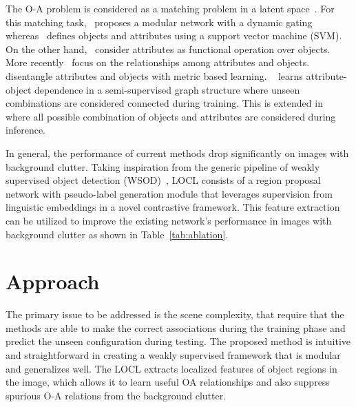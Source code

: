 \documentclass{bmvc2k}
\begin{document}
The O-A problem is considered as a matching problem in a latent space~\cite{misra2017red,Wei_2019_ICCV,nan2019recognizing, purushwalkam2019task}. For this matching task,~\cite{purushwalkam2019task} proposes a modular network with a dynamic gating whereas~\cite{misra2017red} defines objects and attributes using a support vector machine (SVM). On the other hand,~\cite{nagarajan2018attributes,li2020symmetry} consider attributes as functional operation over objects. More recently~\cite{Atzmon_casual,naeem2021learning,mancini2021open,xu2021relation,ruis2021independent} focus on the relationships among attributes and objects. ~\cite{Atzmon_casual} disentangle attributes and objects with metric based learning. ~\cite{naeem2021learning} learns attribute-object dependence in a semi-supervised graph structure where unseen combinations are considered connected during training.  This is extended in~\cite{mancini2021open, xu2021relation, vaswani2017attention} where all possible combination of objects and attributes are considered during inference. 


In general, the performance of current methods  drop significantly on images with background clutter. Taking inspiration from the generic pipeline of weakly supervised object detection (WSOD)~\cite{dietterich1997solving,gonthier2020multiple,uijlings2013selective,kumar2020deep,diba2017weakly,kantorov2016contextlocnet,mcever2022context}, LOCL consists of a region proposal network with pseudo-label generation module that leverages supervision from linguistic embeddings in a novel contrastive framework. This feature extraction can be utilized to improve the existing network's performance in images with background clutter as shown in Table~\ref{tab:ablation}.  \vspace{-0.4cm}
\section{Approach}
\label{method} 
\vspace{-0.2cm}
The primary issue to be addressed is the scene complexity, that require that the methods are able to make the correct associations during the training phase and predict the unseen configuration during testing. The proposed method is intuitive and straightforward in creating a weakly supervised framework that is modular and generalizes well. The LOCL extracts localized features of object regions in the image, which allows it to learn useful OA relationships and also suppress spurious O-A relations from the background clutter. 
\end{document}

